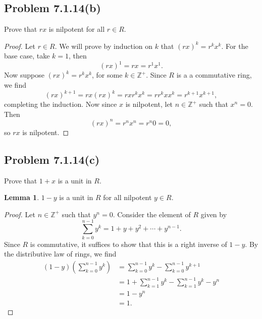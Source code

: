 \documentclass[12pt]{article}
\newenvironment{problem}
    {\begin{lrbox}{\mybox}\begin{minipage}{0.98\textwidth}}
    {\end{minipage}\end{lrbox}\begin{center}\framebox[\textwidth]{\usebox{\mybox}}\end{center}}
\theoremstyle{definition}
\newtheorem{lemma}{Lemma}
\newcommand{\Z}{\mathbb{Z}}
\begin{document}
\subsection{Problem 7.1.14(b)}
\begin{problem}
    Prove that $rx$ is nilpotent for all $r \in R$.
\end{problem}

\begin{proof}
    Let $r \in R$. We will prove by induction on $k$ that $(rx)^k = r^k x^k$. For the base case, take $k = 1$, then
    \[
        (rx)^1 = rx = r^1x^1.
    \]
    Now suppose $(rx)^k = r^k x^k$, for some $k \in \Z^+$. Since $R$ is a a commutative ring, we find
    \[
        (rx)^{k + 1} = rx(rx)^k = rxr^kx^k = rr^kxx^k = r^{k+1}x^{k+1},
    \]
    completing the induction. Now since $x$ is nilpotent, let $n \in \Z^+$ such that $x^n = 0$. Then
    \[
        (rx)^n = r^nx^n = r^n0 = 0,
    \]
    so $rx$ is nilpotent.
    
\end{proof}

\newpage
\subsection{Problem 7.1.14(c)}
\begin{problem}
    Prove that $1 + x$ is a unit in $R$.
\end{problem}

\begin{lemma}
    $1 - y$ is a unit in $R$ for all nilpotent $y \in R$.
\end{lemma}

\begin{proof}
    Let $n \in \Z^+$ such that $y^n = 0$. Consider the element of $R$ given by
    \[
        \sum_{k=0}^{n-1} y^k = 1 + y + y^2 + \cdots + y^{n-1}.
    \]
    Since $R$ is commutative, it suffices to show that this is a right inverse of $1 - y$. By the distributive law of rings, we find
    \begin{align*}
        (1 - y) \left( \sum_{k=0}^{n-1} y^k \right) 
            &= \sum_{k=0}^{n-1} y^k - \sum_{k=0}^{n-1} y^{k+1} \\
            &= 1 + \sum_{k=1}^{n-1} y^k - \sum_{k=1}^{n-1} y^k - y^n \\
            &= 1 - y^n \\
            &= 1.
    \end{align*}
    
\end{proof}
\end{document}
